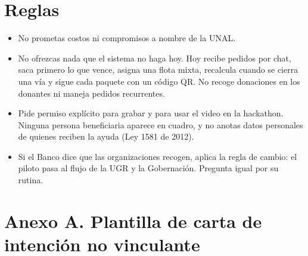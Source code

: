 \documentclass[11pt,letterpaper,parskip=half-]{scrartcl}
\begin{document}
\section{Reglas}

\begin{itemize}[leftmargin=1.2em]
\item No prometas costos ni compromisos a nombre de la UNAL.
\item No ofrezcas nada que el sistema no haga hoy. Hoy recibe pedidos por chat, saca primero lo que vence, asigna una flota mixta, recalcula cuando se cierra una vía y sigue cada paquete con un código QR. No recoge donaciones en los donantes ni maneja pedidos recurrentes.
\item Pide permiso explícito para grabar y para usar el video en la hackathon. Ninguna persona beneficiaria aparece en cuadro, y no anotas datos personales de quienes reciben la ayuda (Ley 1581 de 2012).
\item Si el Banco dice que las organizaciones recogen, aplica la regla de cambio: el piloto pasa al flujo de la UGR y la Gobernación. Pregunta igual por su rutina.
\end{itemize}

\clearpage
\section*{Anexo A. Plantilla de carta de intención no vinculante}
\end{document}
